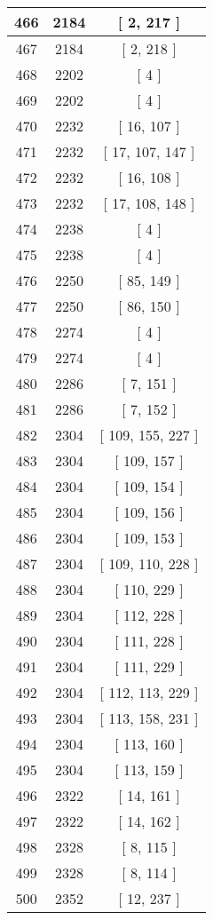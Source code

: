 \begin{center}
\begin{longtable}[H]{|| c c c ||}
\hline
466 & 2184 & [ 2, 217 ] \\ 
\hline
467 & 2184 & [ 2, 218 ] \\ 
\hline
468 & 2202 & [ 4 ] \\ 
\hline
469 & 2202 & [ 4 ] \\ 
\hline
470 & 2232 & [ 16, 107 ] \\ 
\hline
471 & 2232 & [ 17, 107, 147 ] \\ 
\hline
472 & 2232 & [ 16, 108 ] \\ 
\hline
473 & 2232 & [ 17, 108, 148 ] \\ 
\hline
474 & 2238 & [ 4 ] \\ 
\hline
475 & 2238 & [ 4 ] \\ 
\hline
476 & 2250 & [ 85, 149 ] \\ 
\hline
477 & 2250 & [ 86, 150 ] \\ 
\hline
478 & 2274 & [ 4 ] \\ 
\hline
479 & 2274 & [ 4 ] \\ 
\hline
480 & 2286 & [ 7, 151 ] \\ 
\hline
481 & 2286 & [ 7, 152 ] \\ 
\hline
482 & 2304 & [ 109, 155, 227 ] \\ 
\hline
483 & 2304 & [ 109, 157 ] \\ 
\hline
484 & 2304 & [ 109, 154 ] \\ 
\hline
485 & 2304 & [ 109, 156 ] \\ 
\hline
486 & 2304 & [ 109, 153 ] \\ 
\hline
487 & 2304 & [ 109, 110, 228 ] \\ 
\hline
488 & 2304 & [ 110, 229 ] \\ 
\hline
489 & 2304 & [ 112, 228 ] \\ 
\hline
490 & 2304 & [ 111, 228 ] \\ 
\hline
491 & 2304 & [ 111, 229 ] \\ 
\hline
492 & 2304 & [ 112, 113, 229 ] \\ 
\hline
493 & 2304 & [ 113, 158, 231 ] \\ 
\hline
494 & 2304 & [ 113, 160 ] \\ 
\hline
495 & 2304 & [ 113, 159 ] \\ 
\hline
496 & 2322 & [ 14, 161 ] \\ 
\hline
497 & 2322 & [ 14, 162 ] \\ 
\hline
498 & 2328 & [ 8, 115 ] \\ 
\hline
499 & 2328 & [ 8, 114 ] \\ 
\hline
500 & 2352 & [ 12, 237 ] \\ 

\end{longtable}
\end{center}
